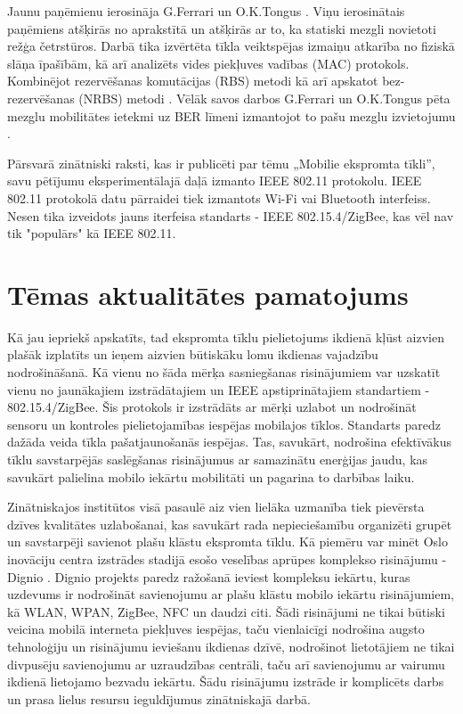 Jaunu paņēmienu ierosināja G.Ferrari un O.K.Tongus \cite{tonferBOOK}. Viņu ierosinātais paņēmiens atšķirās no \cite{neely1} aprakstītā un atšķirās ar to, ka statiski mezgli novietoti režģa četrstūros. Darbā tika izvērtēta tīkla veiktspējas izmaiņu atkarība no fiziskā slāņa īpašībām, kā arī analizēts vides piekļuves vadības (\acs{MAC}) protokols. Kombinējot rezervēšanas komutācijas (\acs{RBS}) metodi \cite{ferrari17} kā arī apskatot bez-rezervēšanas (\acs{NRBS}) metodi \cite{tonguz18}. Vēlāk savos darbos G.Ferrari un O.K.Tongus pēta mezglu mobilitātes ietekmi uz BER līmeni izmantojot to pašu mezglu izvietojumu \cite{tonferBOOK}.

Pārsvarā zinātniski raksti, kas ir publicēti par tēmu „Mobilie ekspromta tīkli”, savu pētījumu eksperimentālajā daļā izmanto IEEE 802.11 protokolu. IEEE 802.11 protokolā datu pārraidei tiek izmantots Wi-Fi vai Bluetooth interfeiss. Nesen tika izveidots jauns iterfeisa standarts - IEEE 802.15.4/ZigBee, kas vēl nav tik "populārs" kā IEEE 802.11.

\section{Tēmas aktualitātes pamatojums}
Kā jau iepriekš apskatīts, tad ekspromta tīklu pielietojums ikdienā kļūst aizvien plašāk izplatīts un ieņem aizvien būtiskāku lomu ikdienas vajadzību nodrošināšanā. Kā vienu no šāda mērķa sasniegšanas risinājumiem var uzskatīt vienu no jaunākajiem izstrādātajiem un IEEE apstiprinātajiem standartiem - 802.15.4/ZigBee. Šis protokols ir izstrādāts ar mērķi uzlabot un nodrošināt sensoru un kontroles pielietojamības iespējas mobilajos tīklos. Standarts paredz dažāda veida tīkla pašatjaunošanās iespējas. Tas, savukārt, nodrošina efektīvākus tīklu savstarpējās saslēgšanas risinājumus ar samazinātu enerģijas jaudu, kas savukārt palielina mobilo iekārtu mobilitāti un pagarina to darbības laiku.

Zinātniskajos institūtos visā pasaulē aiz vien lielāka uzmanība tiek pievērsta dzīves kvalitātes uzlabošanai, kas savukārt rada nepieciešamību organizēti grupēt un savstarpēji savienot plašu klāstu ekspromta tīklu. Kā piemēru var minēt Oslo inovāciju centra izstrādes stadijā esošo veselības aprūpes komplekso risinājumu - Dignio \cite{dingio}.
Dignio projekts paredz ražošanā ieviest kompleksu iekārtu, kuras uzdevums ir nodrošināt savienojumu ar plašu klāstu mobilo iekārtu risinājumiem, kā WLAN, WPAN, ZigBee, NFC un daudzi citi. Šādi risinājumi ne tikai būtiski veicina mobilā interneta piekļuves iespējas, taču vienlaicīgi nodrošina augsto tehnoloģiju un risinājumu ieviešanu ikdienas dzīvē, nodrošinot lietotājiem ne tikai divpusēju savienojumu ar uzraudzības centrāli, taču arī savienojumu ar vairumu ikdienā lietojamo bezvadu iekārtu. Šādu risinājumu izstrāde ir komplicēts darbs un prasa lielus resursu ieguldījumus zinātniskajā darbā.

